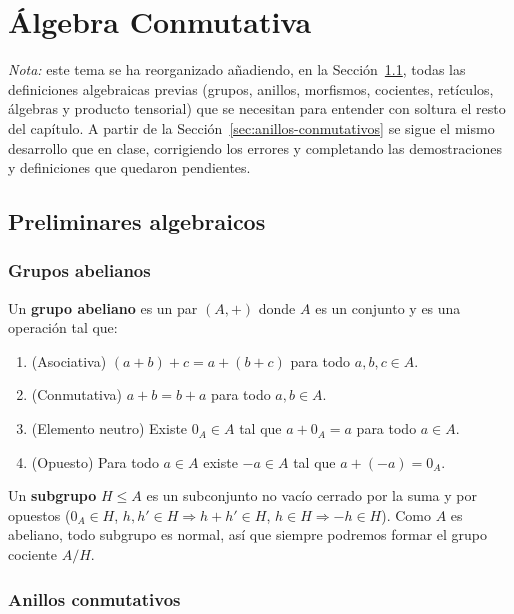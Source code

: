\chapter{Álgebra Conmutativa}

\emph{Nota:} este tema se ha reorganizado añadiendo, en la Sección~\ref{sec:preliminares}, todas las definiciones algebraicas previas (grupos, anillos, morfismos, cocientes, retículos, álgebras y producto tensorial) que se necesitan para entender con soltura el resto del capítulo. A partir de la Sección~\ref{sec:anillos-conmutativos} se sigue el mismo desarrollo que en clase, corrigiendo los errores y completando las demostraciones y definiciones que quedaron pendientes.

\section{Preliminares algebraicos}\label{sec:preliminares}

\subsection{Grupos abelianos}

\begin{definicion}
Un \textbf{grupo abeliano} es un par $(A,+)$ donde $A$ es un conjunto y
es una operación tal que:
\begin{enumerate}
    \item (Asociativa) $(a+b)+c = a+(b+c)$ para todo $a,b,c\in A$.
    \item (Conmutativa) $a+b=b+a$ para todo $a,b \in A$.
    \item (Elemento neutro) Existe $0_A\in A$ tal que $a+0_A = a$ para todo $a\in A$.
    \item (Opuesto) Para todo $a\in A$ existe $-a\in A$ tal que $a+(-a)=0_A$.
\end{enumerate}
\end{definicion}

Un \textbf{subgrupo} $H\leq A$ es un subconjunto no vacío cerrado por la suma y por opuestos ($0_A\in H$, $h,h'\in H \Rightarrow h+h'\in H$, $h\in H\Rightarrow -h\in H$). Como $A$ es abeliano, todo subgrupo es normal, así que siempre podremos formar el grupo cociente $A/H$.

\subsection{Anillos conmutativos}

